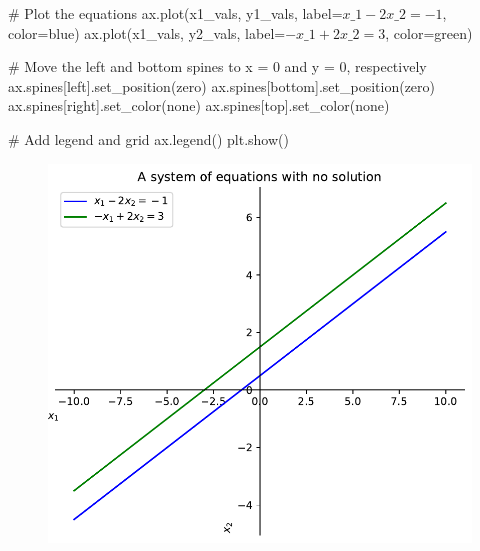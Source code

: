 \documentclass[
  letterpaper,
  DIV=11,
  numbers=noendperiod]{scrreprt}
\newenvironment{Shaded}{\begin{snugshade}}{\end{snugshade}}
\newcommand{\CommentTok}[1]{\textcolor[rgb]{0.37,0.37,0.37}{#1}}
\newcommand{\NormalTok}[1]{\textcolor[rgb]{0.00,0.23,0.31}{#1}}
\newcommand{\OperatorTok}[1]{\textcolor[rgb]{0.37,0.37,0.37}{#1}}
\newcommand{\StringTok}[1]{\textcolor[rgb]{0.13,0.47,0.30}{#1}}
\begin{document}
\begin{Shaded}
\begin{Highlighting}[]
\CommentTok{\# Plot the equations}
\NormalTok{ax.plot(x1\_vals, y1\_vals, label}\OperatorTok{=}\StringTok{\textquotesingle{}$x\_1 {-} 2x\_2 = {-}1$\textquotesingle{}}\NormalTok{, color}\OperatorTok{=}\StringTok{\textquotesingle{}blue\textquotesingle{}}\NormalTok{)}
\NormalTok{ax.plot(x1\_vals, y2\_vals, label}\OperatorTok{=}\StringTok{\textquotesingle{}${-}x\_1 + 2x\_2 = 3$\textquotesingle{}}\NormalTok{, color}\OperatorTok{=}\StringTok{\textquotesingle{}green\textquotesingle{}}\NormalTok{)}

\CommentTok{\# Move the left and bottom spines to x = 0 and y = 0, respectively}
\NormalTok{ax.spines[}\StringTok{\textquotesingle{}left\textquotesingle{}}\NormalTok{].set\_position(}\StringTok{\textquotesingle{}zero\textquotesingle{}}\NormalTok{)}
\NormalTok{ax.spines[}\StringTok{\textquotesingle{}bottom\textquotesingle{}}\NormalTok{].set\_position(}\StringTok{\textquotesingle{}zero\textquotesingle{}}\NormalTok{)}
\NormalTok{ax.spines[}\StringTok{\textquotesingle{}right\textquotesingle{}}\NormalTok{].set\_color(}\StringTok{\textquotesingle{}none\textquotesingle{}}\NormalTok{)}
\NormalTok{ax.spines[}\StringTok{\textquotesingle{}top\textquotesingle{}}\NormalTok{].set\_color(}\StringTok{\textquotesingle{}none\textquotesingle{}}\NormalTok{)}

\CommentTok{\# Add legend and grid}
\NormalTok{ax.legend()}
\NormalTok{plt.show()}
\end{Highlighting}
\end{Shaded}

\begin{figure}[H]

{\centering \includegraphics{p1_files/figure-pdf/cell-6-output-1.pdf}

}

\end{figure}
\end{document}
